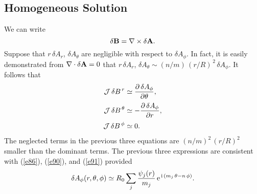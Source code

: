 \documentclass[12pt]{article}
\begin{document}
\subsection{Homogeneous Solution}
We can write
\begin{equation}
\delta {\bf B} = \nabla \times \delta {\bf A}.
\end{equation}
Suppose that $r\,\delta A_r$, $\delta A_\theta$ are negligible with respect to
$\delta A_\phi$. In fact, it is easily demonstrated from $\nabla\cdot\delta {\bf A}=0$ that $r\,\delta A_r$, $\delta A_\theta\sim (n/m)\,(r/R)^{\,2}\,\delta A_\phi$. 
 It follows that
\begin{align}
{\cal  J}\,\delta B^{\,r} &\simeq \frac{\partial\,\delta A_\phi}{\partial\theta},\\[0.5ex]
{\cal J}\,\delta B^{\,\theta} &\simeq - \frac{\partial\,\delta A_\phi}{\partial r},\\[0.5ex]
{\cal J}\,\delta B^{\,\phi} &\simeq 0.
\end{align}
The neglected terms in the previous three equations are $(n/m)^2\,(r/R)^2$ smaller than the dominant terms. 
The previous three expressions are consistent with (\ref{e86}), (\ref{e90}), and (\ref{e91}) provided
\begin{equation}
\delta A_\phi(r,\theta,\phi) \simeq R_0\sum_j\frac{\psi_j(r)}{m_j} \,{\rm e}^{\,{\rm i}\,(m_j\,\theta-n\,\phi)}.\label{e112}
\end{equation}
\end{document}
